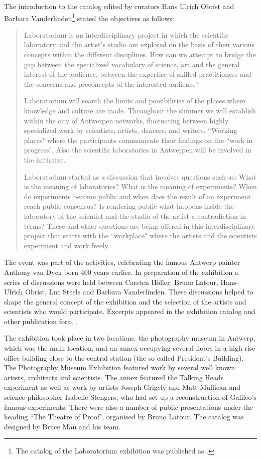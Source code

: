 The introduction to the catalog edited by curators Hans Ulrich Obrist
and Barbara Vanderlinden\footnote{
The catalog of the Laboratorium exhibition was published as 
\cite{Obrist:1999}.} stated the objectives as follows: 
\begin{quotation}
{ Laboratorium is an interdisciplinary project in which the scientific laboratory and the artist's studio are explored
on the basis of their various concepts within the different disciplines. How can we attempt to bridge the gap between 
the specialized vocabulary of science, art and the general interest of the audience, between the expertise of skilled
practitioners and the concerns and preconcepts of the interested audience? 

Laboratorium will search the limits and possibilities of the places where knowledge and culture are made. Throughout 
the summer we will establish within the city of Antwerpen networks, fluctuating between highly specialized work by 
scientists, artists, dancers, and writers. ``Working places" where the participants communicate their findings on the 
``work in progress". Also the scientific laboratories in Antwerpen will be involved in the initiative. 

Laboratorium started as a discussion that involves questions such as: What is the meaning of laboratories? What is 
the meaning of experiments? When do experiments become public and when does the result of an experiment reach 
public consensus? Is rendering public what happens inside the laboratory of the scientist and the studio of the 
artist a contradiction in terms? These and other questions are being offered in this interdisciplinary project 
that starts with the ``workplace" where the artists and the scientists experiment and work freely.}
\end{quotation}

The event was part of the activities, celebrating the famous Antwerp painter Anthony van Dyck born 400 years earlier.
In preparation of the exhibition a series of discussions were held between  
Carsten H\"{o}ller, Bruno Latour, Hans-Ulrich Obrist, Luc Steels and Barbara Vanderlinden. These discussions helped 
to shape the general concept of the exhibition and the selection of the artists and scientists who would participate. 
Excerpts appeared in the exhibition catalog and other publication fora, \cite{Obrist:2003}. 

The exhibition took place in two locations: the photography museum in Antwerp, which was the main location, and an annex 
occupying several floors in a high rise office building close to the central station (the so called President's
Building). The Photography Museum Exhibition featured work by several well known artists, architects and scientists. 
The annex featured the Talking Heads experiment as well as 
work by artists Joseph Grigely and Matt Mullican and science philosopher 
Isabelle Stengers, who had set up a reconstruction of Galileo's famous experiments. 
There were also a number of public presentations under the heading 
``The Theatre of Proof", organised by Bruno Latour. The catalog was designed by Bruce Mau and his team. 


